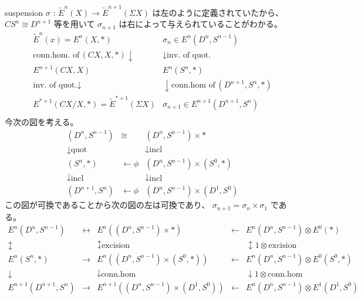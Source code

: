 \documentclass[dvipdfmx]{jsarticle}
\begin{document}
\begin{Proof}
\itemprof
  suspension \(\sigma\) : \(\tilde{E}^{n}(X) \to \tilde{E}^{n+1}(\Sigma X)\) は左のように定義されていたから、\(C S^n \cong D^{n+1}\) 等を用いて \(\sigma_{n+1}\) は右によって与えられていることがわかる。
  \[\begin{matrix}
    \tilde{E}^{n}(x) = E^{n}(X, *) &
      \sigma_{n} \in E^{n}(D^{n}, S^{n-1}) \\
    \text{conn.hom. of} \, (CX, X, *) \downarrow &
      \downarrow \text{inv. of quot.} \\
    E^{n+1}(CX, X) &
      E^{n}(S^{n}, *) \\
    \text{inv. of quot.} \downarrow &
      \downarrow \text{conn.hom of} \, (D^{n+1}, S^{n}, *)  \\
    E^{*+1}(CX/X, *) = \tilde{E}^{*+1}(\Sigma X) &
      \sigma_{n+1} \in E^{n+1}(D^{n+1}, S^{n}) \\
  \end{matrix}\]
  今次の図を考える。
  \[\begin{matrix}
    (D^{n}, S^{n-1}) & \cong & (D^{n}, S^{n-1}) \times * \\
    \downarrow \text{quot} & & \downarrow \text{incl} \\
    (S^{n}, *) & \leftarrow \phi & (D^{n}, S^{n-1}) \times (S^{0}, *) \\
    \downarrow \text{incl} & & \downarrow \text{incl} \\
    (D^{n+1}, S^{n}) & \leftarrow \phi & (D^{n}, S^{n-1}) \times (D^{1}, S^{0})
  \end{matrix}\]
  この図が可換であることから次の図の左は可換であり、 \(\sigma_{n+1} = \sigma_{n} \times \sigma_{1}\) である。
  \[\begin{matrix}
    E^{n}(D^{n}, S^{n-1}) & \leftrightarrow & E^{n}((D^{n}, S^{n-1}) \times *) & \leftarrow & E^{n}(D^{n}, S^{n-1}) \otimes E^{0}(*) \\
    \updownarrow & & \updownarrow \text{excision} & & \updownarrow 1 \otimes \text{excision} \\
    E^{n}(S^{n}, *) & \rightarrow & E^{n}((D^{n}, S^{n-1}) \times (S^{0}, *)) & \leftarrow & E^{n}(D^{n}, S^{n-1}) \otimes E^{0}(S^0, *) \\
    \downarrow & & \downarrow \text{conn.hom} & & \downarrow 1 \otimes \text{conn.hom} \\
    E^{n+1}(D^{n+1}, S^{n}) & \to & E^{n+1}((D^{n}, S^{n-1}) \times (D^{1}, S^{0})) & \leftarrow &E^{n}(D^{n}, S^{n-1}) \otimes E^{1}(D^{1}, S^{0})
  \end{matrix}\]

\end{Proof}
\end{document}
